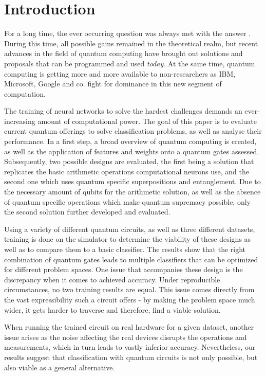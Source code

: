 
\chapter{Introduction} %

\label{chapter:introduction}

For a long time, the ever occurring question  was always met with the answer . During this time, all possible gains remained in the theoretical realm\cite{shor_polynomial-time_1997}, but recent advances in the field of quantum computing have brought out solutions and proposals\cite{farhi_quantum_2014, fankhauser_multiple_2021, havlicek_supervised_2019} that can be programmed and used \emph{today}. At the same time, quantum computing is getting more and more available to non-researchers as IBM, Microsoft, Google and co. fight for dominance in this new segment of computation.\par
The training of neural networks to solve the hardest challenges demands an ever-increasing amount of computational power\cite{openai_ai_2018}. The goal of this paper is to evaluate current quantum offerings to solve classification problems, as well as analyse their performance. In a first step, a broad overview of quantum computing is created, as well as the application of features and weights onto a quantum gates assessed. Subsequently, two possible designs are evaluated, the first being a solution that replicates the basic arithmetic operations computational neurons use, and the second one which uses quantum specific superpositions and entanglement. Due to the necessary amount of qubits for the arithmetic solution, as well as the absence of quantum specific operations which make quantum supremacy possible, only the second solution further developed and evaluated.\par 
Using a variety of different quantum circuits, as well as three different datasets, training is done on the simulator to determine the viability of these designs as well as to compare them to a basic  classifier. The results show that the right combination of quantum gates leads to multiple classifiers that can be optimized for different problem spaces. One issue that accompanies these design is the discrepancy when it comes to achieved accuracy. Under reproducible circumstances, no two training results are equal. This issue comes directly from the vast expressibility such a circuit offers - by making the problem space much wider, it gets harder to traverse and therefore, find a viable solution.\par 
When running the trained circuit on real hardware for a given dataset, another issue arises as the noise affecting the real devices disrupts the operations and measurements, which in turn leads to vastly inferior accuracy. Nevertheless, our results suggest that classification with quantum circuits is not only possible, but also viable as a general alternative.